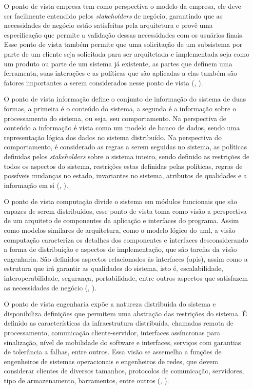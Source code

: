 \documentclass[]{politex}
\begin{document}
O ponto de vista empresa tem como perspectiva o modelo da empresa, ele deve ser facilmente entendido pelos \textit{stakeholders} de negócio, garantindo que as necessidades de negócio estão satisfeitas pela arquitetura e provê uma especificação que permite a validação dessas necessidades com os usuários finais. Esse ponto de vista também permite que uma solicitação de um subsistema por parte de um cliente seja solicitada para ser arquitetada e implementada seja como um produto ou parte de um sistema já existente, as partes que definem uma ferramenta, suas interações e as políticas que são aplicadas a elas também são fatores importantes a serem considerados nesse ponto de vista (, \citeyear{putman2001architecting}).

O ponto de vista informação define o conjunto de informação do sistema de duas formas, a primeira é o conteúdo do sistema, a segunda é a informação sobre o processamento do sistema, ou seja, seu comportamento. Na perspectiva de conteúdo a informação é vista como um modelo de banco de dados, sendo uma representação lógica dos dados no sistema distribuído. Na perspectiva do comportamento, é considerado as regras a serem seguidas no sistema, as políticas definidas pelos \textit{stakeholders} sobre o sistema inteiro, sendo definido as restrições de todos os aspectos do sistema, restrições estas definidas pelas políticas, regras de possíveis mudanças no estado, invariantes no sistema, atributos de qualidades e a informação em si (, \citeyear{putman2001architecting}).

O ponto de vista computação divide o sistema em módulos funcionais que são capazes de serem distribuídos, esse ponto de vista toma como visão a perspectiva de um arquiteto de componentes da aplicação e interfaces do programa. Assim como modelos similares de arquitetura, como o modelo lógico do \acrshort{uml}, a visão computação caracteriza os detalhes dos componentes e interfaces desconsiderando a forma de distribuição e aspectos de implementação, que são tarefas da visão engenharia. São definidos aspectos relacionados às interfaces (\acrshort{api}s), assim como a estrutura que irá garantir as qualidades do sistema, isto é, escalabilidade, interoperabilidade, segurança, portabilidade, entre outros aspectos que satisfazem as necessidades de negócio (, \citeyear{putman2001architecting}).

O ponto de vista engenharia expõe  a natureza distribuída do sistema e disponibiliza definições que permitem uma abstração das restrições do sistema. É definido as características da infraestrutura distribuída, chamadas remota de processamento, comunicação cliente-servidor, interfaces assíncronas para sinalização, nível de mobilidade do software e interfaces, serviços com garantias de tolerância a falhas, entre outros. Essa visão se assemelha a funções de engenheiros de sistemas operacionais e engenheiros de redes, que devem considerar clientes de diversos tamanhos, protocolos de comunicação, servidores, tipo de armazenamento, barramentos, entre outros (, \citeyear{putman2001architecting}).
\end{document}

